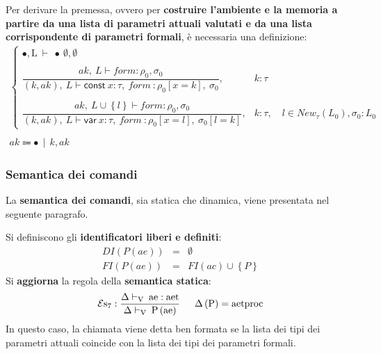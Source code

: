 \documentclass[a4paper]{article}
\begin{document}
	\noindent
	Per derivare la premessa, ovvero per \textbf{costruire l'ambiente e la memoria a partire da una lista di parametri attuali valutati e da una lista corrispondente di parametri formali}, è necessaria una definizione:
	\begin{gather*}
		\begin{cases}
			\bullet, \mathrm{L} \: \vdash \: \bullet \: \emptyset, \emptyset \\
			\\
			\dfrac{
				ak, \: L \vdash form: \rho_{0}, \sigma_{0}
			}{
				\left(k, ak\right), \: L \vdash \textsf{const} \: x:\tau, \: form \: : \rho_{0}\left[x = k\right], \: \sigma_{0}
			}, & k : \tau \\
			\\
			\dfrac{
				ak, \: L \cup \left\{l\right\} \vdash form: \rho_{0}, \sigma_{0}
			}{
				\left(k, ak\right), \: L \vdash \textsf{var} \: x:\tau, \: form \: : \rho_{0}\left[x = l\right], \: \sigma_{0}\left[l = k\right]
			}, & k : \tau, \hspace{1em} l \in New_{\tau}\left(L_{0}\right), \sigma_{0}:L_{0}
		\end{cases} \\
		\\
		ak \Coloneq \bullet \:\: | \:\: k, ak
	\end{gather*}\newpage
	
	\subsubsection{Semantica dei comandi}
	
	La \textbf{semantica dei comandi}, sia statica che dinamica, viene presentata nel seguente paragrafo.\newline
	
	\noindent
	Si definiscono gli \textbf{identificatori liberi e definiti}:
	\begin{equation*}
		\begin{array}{lll}
			DI\left(P\left(ae\right)\right) &=& \emptyset \\
			FI\left(P\left(ae\right)\right) &=& FI\left(ac\right) \cup \left\{P\right\}
		\end{array}
	\end{equation*}
	Si \textbf{aggiorna} la regola della \textbf{semantica statica}:
	\begin{equation*}
		\mathcal{E}\mathrm{s}_{7} : \dfrac{
			\Delta\vdash_{\mathrm{V}} \: \mathrm{ae}:\mathrm{aet}
		}{
			\Delta\vdash_{\mathrm{V}} \: \mathrm{P}\left(\mathrm{ae}\right)
		} \hspace{1.5em}
		\Delta\left(\mathrm{P}\right) = \mathrm{aetproc}
	\end{equation*}
	In questo caso, la chiamata viene detta ben formata se la lista dei tipi dei parametri attuali coincide con la lista dei tipi dei parametri formali.\newline
	
\end{document}
